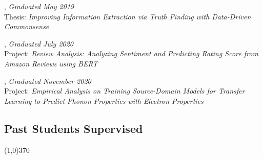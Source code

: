 \documentclass[10pt]{article}
\newenvironment{myindentpar}[1]%
{\begin{list}{}%
         {\setlength{\leftmargin}{#1}}%
         \item[]%
}
{\end{list}}
\newcounter{list}
\begin{document}
\begin{myindentpar}{0.75cm}

\hspace{-0.75cm}{\bf Xueying Wang}, \textit{Graduated May 2019} \\
	{Thesis: \textit{Improving Information Extraction via Truth Finding with Data-Driven Commonsense}}

\hspace{-0.75cm}{\bf Bhakti Sharma}, \textit{Graduated July 2020} \\
	{Project: \textit{Review Analysis: Analyzing Sentiment and Predicting Rating Score from Amazon Reviews using BERT}}
	
\hspace{-0.75cm}{\bf Jianing Li}, \textit{Graduated November 2020} \\
	{Project: \textit{Empirical Analysis on Training Source-Domain Models for Transfer Learning to Predict Phonon Properties with Electron Properties}}

\end{myindentpar}

\subsection{\sc Past Students Supervised}
\vspace{-0.4cm} \line(1,0){370} \vspace{-0.1cm}
\end{document}
